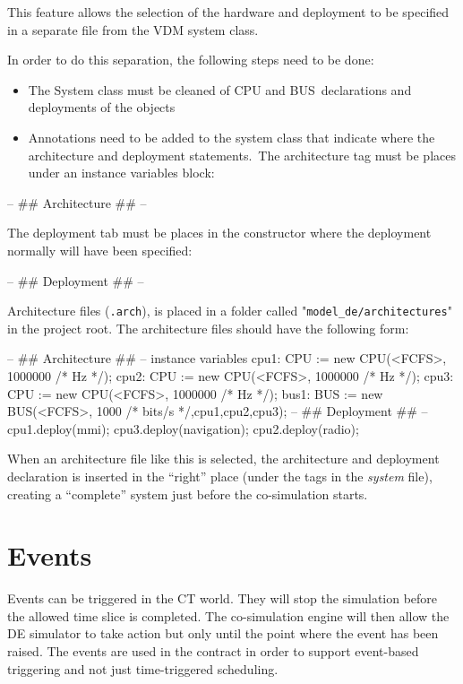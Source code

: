 \documentclass{crescendorepchap}
\begin{document}
This feature allows the selection of the hardware and deployment to be
specified in a separate file from the VDM system class.

In order to do this separation, the following steps need to be done:

\begin{itemize}
\item
  The System class must be cleaned of CPU and BUS~declarations and
  deployments of the objects
\item
  Annotations need to be added to the system class that indicate where
  the architecture and deployment statements.~The architecture tag must
  be places under an instance variables block:
\end{itemize}

\begin{vdmrt}
-- ## Architecture ## -- 
\end{vdmrt}

The deployment tab must be places in the constructor where the
deployment normally will have been specified:

\begin{vdmrt}
-- ## Deployment ## -- 
\end{vdmrt}

Architecture files (\texttt{.arch}), is placed in a folder called
"\texttt{model\_de/architectures}" in the project root. The
architecture files should have the following form:

\begin{vdmrt}
-- ## Architecture ## --
instance variables
cpu1: CPU := new CPU(<FCFS>, 1000000 /* Hz */);
cpu2: CPU := new CPU(<FCFS>, 1000000 /* Hz */);
cpu3: CPU := new CPU(<FCFS>, 1000000 /* Hz */);
bus1: BUS := new BUS(<FCFS>, 1000 /* bits/s */,{cpu1,cpu2,cpu3});
-- ## Deployment ## --
cpu1.deploy(mmi);
cpu3.deploy(navigation);
cpu2.deploy(radio);
\end{vdmrt}

When an architecture file like this is selected, the architecture and
deployment declaration is inserted in the ``right'' place (under the
tags in the \emph{system} file), creating a ``complete'' system just
before the co-simulation starts.

\section{Events}

Events can be triggered in the CT world. They will stop the simulation
before the allowed time slice is completed. The co-simulation engine
will then allow the DE simulator to take action but only until the point
where the event has been raised. The events are used in the contract in
order to support event-based triggering and not just time-triggered
scheduling.
\end{document}
